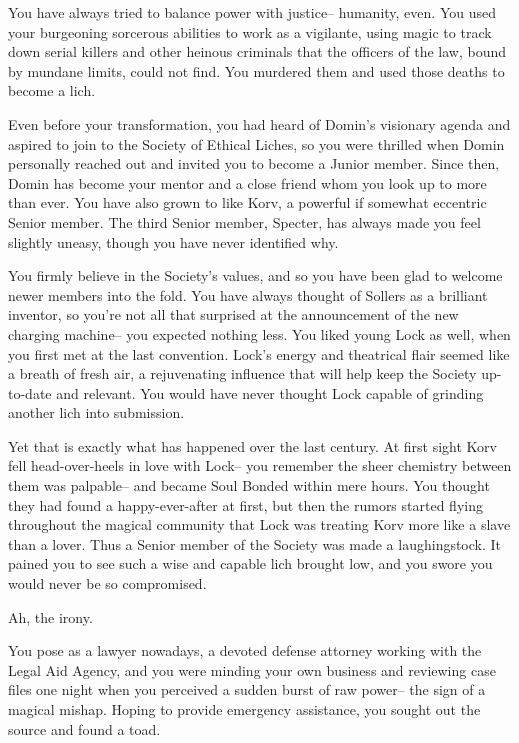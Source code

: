 \documentclass[char]{Sel}
\begin{document}
\name{\cTyran{}}  %
You have always tried to balance power with justice-- humanity, even. You used your burgeoning sorcerous abilities to work as a vigilante, using magic to track down serial killers and other heinous criminals that the officers of the law, bound by mundane limits, could not find. You murdered them and used those deaths to become a lich.

Even before your transformation, you had heard of Domin's visionary agenda and aspired to join to the Society of Ethical Liches, so you were thrilled when Domin personally reached out and invited you to become a Junior member. Since then, Domin has become your mentor and a close friend whom you look up to more than ever. You have also grown to like Korv, a powerful if somewhat eccentric Senior member. The third Senior member, Specter, has always made you feel slightly uneasy, though you have never identified why.

You firmly believe in the Society's values, and so you have been glad to welcome newer members into the fold. You have always thought of Sollers as a brilliant inventor, so you're not all that surprised at the announcement of the new charging machine-- you expected nothing less. You liked young Lock as well, when you first met at the last convention. Lock's energy and theatrical flair seemed like a breath of fresh air, a rejuvenating influence that will help keep the Society up-to-date and relevant. You would have never thought Lock capable of grinding another lich into submission.

Yet that is exactly what has happened over the last century. At first sight Korv fell head-over-heels in love with Lock-- you remember the sheer chemistry between them was palpable-- and became Soul Bonded within mere hours. You thought they had found a happy-ever-after at first, but then the rumors started flying throughout the magical community that Lock was treating Korv more like a slave than a lover. Thus a Senior member of the Society was made a laughingstock. It pained you to see such a wise and capable lich brought low, and you swore you would never be so compromised.

Ah, the irony.

You pose as a lawyer nowadays, a devoted defense attorney working with the Legal Aid Agency, and you were minding your own business and reviewing case files one night when you perceived a sudden burst of raw power-- the sign of a magical mishap. Hoping to provide emergency assistance, you sought out the source and found a toad. 
\end{document}
